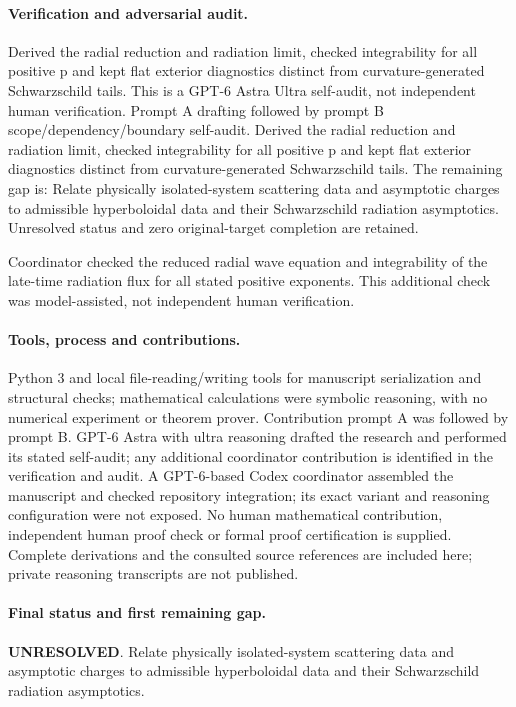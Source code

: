 \documentclass[11pt]{article}
\begin{document}
\paragraph{Verification and adversarial audit.}
Derived the radial reduction and radiation limit, checked integrability for all positive p and kept flat exterior diagnostics distinct from curvature-generated Schwarzschild tails. This is a GPT-6 Astra Ultra self-audit, not independent human verification. Prompt A drafting followed by prompt B scope/dependency/boundary self-audit. Derived the radial reduction and radiation limit, checked integrability for all positive p and kept flat exterior diagnostics distinct from curvature-generated Schwarzschild tails. The remaining gap is: Relate physically isolated-system scattering data and asymptotic charges to admissible hyperboloidal data and their Schwarzschild radiation asymptotics. Unresolved status and zero original-target completion are retained.

Coordinator checked the reduced radial wave equation and integrability of the late-time radiation flux for all stated positive exponents. This additional check was model-assisted, not independent human verification.

\paragraph{Tools, process and contributions.}
Python 3 and local file-reading/writing tools for manuscript serialization and structural checks; mathematical calculations were symbolic reasoning, with no numerical experiment or theorem prover. Contribution prompt A was followed by prompt B. GPT-6 Astra with ultra reasoning drafted the research and performed its stated self-audit; any additional coordinator contribution is identified in the verification and audit. A GPT-6-based Codex coordinator assembled the manuscript and checked repository integration; its exact variant and reasoning configuration were not exposed. No human mathematical contribution, independent human proof check or formal proof certification is supplied. Complete derivations and the consulted source references are included here; private reasoning transcripts are not published.

\paragraph{Final status and first remaining gap.}
\textbf{UNRESOLVED}. Relate physically isolated-system scattering data and asymptotic charges to admissible hyperboloidal data and their Schwarzschild radiation asymptotics.
\end{document}
